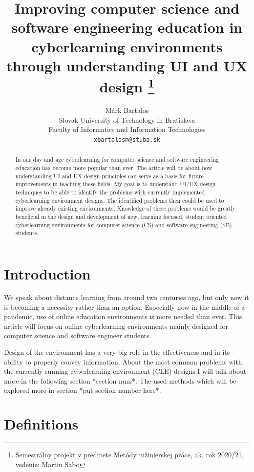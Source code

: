 \documentclass[10pt,twoside,english,a4paper]{article}
\title{Improving computer science and software 
engineering education in cyberlearning 
environments through understanding UI and UX design
\thanks{Semestrálny projekt v predmete Metódy inžinierskej práce,
 ak. rok 2020/21, vedenie: Martin Sabo}}
\author{Márk Bartalos \\[2pt]
        \small{Slovak University of Technology in Bratislava}\\
        \small{Faculty of Informatics and Information Technologies}\\
        \small{\texttt{xbartalosm@stuba.sk}}
}
\begin{document}
\maketitle

\begin{abstract}
    In our day and age cyberlearning for computer science and software engineering education has become more popular than ever. 
The article will be about how understanding UI and UX design principles can serve as a basis for future improvements in teaching
these fields. My goal is to understand UI/UX design techniques to be able to identify the problems with currently 
implemented cyberlearning environment designs. The identified problems then could be used to improve already existing environments.
Knowledge of these problems would be greatly beneficial in the design and development of new, learning focused, student 
oriented cyberlearning environments for computer science (CS) and software engineering (SE) students.
\end{abstract}



\section{Introduction}
We speak about distance learning from around two centuries ago\cite{moore_2011_elearning}, but only now
it is becoming a necessity rather than an option. Especially now in the middle of a pandemic, use of online 
education environments is more needed than ever. This article will focus on online cyberlearning environments 
mainly designed for computer science and software engineer students. 


Design of the environment has a very big role in the effectiveness and in 
its ability to properly convey information. \cite{ui/ux}
About the most common problems with the currently running cyberlearning environment (CLE)
designs I will talk about more in the following section *section num*.
The used methods which will be explored more in section *put section number here*.

\section{Definitions}
\end{document}
